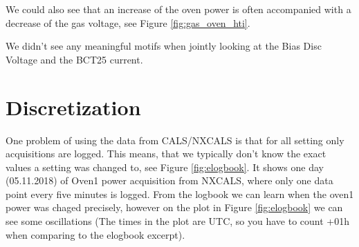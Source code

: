 \documentclass[12pt,a4paper]{article}
\begin{document}
We could also see that an increase of the oven power is often accompanied with a decrease of the gas voltage, see Figure \ref{fig:gas_oven_hti}.

We didn't see any meaningful motifs when jointly looking at the Bias Disc Voltage and the BCT25 current.

\hypertarget{discretization}{%
\section{Discretization}\label{discretization}}

One problem of using the data from CALS/NXCALS is that for all setting only acquisitions are logged. This means, that we typically don't know the exact values a setting was changed to, see Figure \ref{fig:elogbook}. It shows one day (05.11.2018) of Oven1 power acquisition from NXCALS, where only one data point every five minutes is logged. From the logbook we can learn when the oven1 power was chaged precisely, however on the plot in Figure \ref{fig:elogbook} we can see some oscillations (The times in the plot are UTC, so you have to count +01h when comparing to the elogbook excerpt). 
\end{document}
